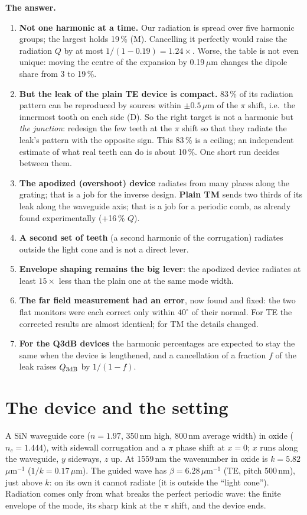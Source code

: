 \documentclass[11pt,a4paper]{article}
\begin{document}
\textbf{The answer.}
\begin{enumerate}\setlength{\itemsep}{2pt}
\item \textbf{Not one harmonic at a time.} Our radiation is spread over five harmonic groups; the largest holds 19\,\%
(M). Cancelling it perfectly would raise the radiation $Q$ by at most $1/(1-0.19)=1.24\times$. Worse, the table is not
even unique: moving the centre of the expansion by 0.19\,$\mu$m changes the dipole share from 3 to 19\,\%.
\item \textbf{But the leak of the plain TE device is compact.} 83\,\% of its radiation pattern can be reproduced by
sources within $\pm0.5$\,$\mu$m of the $\pi$ shift, i.e.\ the innermost tooth on each side (D). So the right target is
not a harmonic but \emph{the junction}: redesign the few teeth at the $\pi$ shift so that they radiate the leak's
pattern with the opposite sign. This 83\,\% is a ceiling; an independent estimate of what real teeth can do is about
10\,\%. One short run decides between them.
\item \textbf{The apodized (overshoot) device} radiates from many places along the grating; that is a job for the
inverse design. \textbf{Plain TM} sends two thirds of its leak along the waveguide axis; that is a job for a periodic
comb, as already found experimentally (+16\,\% $Q$).
\item \textbf{A second set of teeth} (a second harmonic of the corrugation) radiates outside the light cone and is not
a direct lever.
\item \textbf{Envelope shaping remains the big lever}: the apodized device radiates at least $15\times$ less than the
plain one at the same mode width.
\item \textbf{The far field measurement had an error}, now found and fixed: the two flat monitors were each correct only
within $40^\circ$ of their normal. For TE the corrected results are almost identical; for TM the details changed.
\item \textbf{For the Q3dB devices} the harmonic percentages are expected to stay the same when the device is lengthened,
and a cancellation of a fraction $f$ of the leak raises $Q_{3\rm dB}$ by $1/(1-f)$.
\end{enumerate}

\section{The device and the setting}
A SiN waveguide core ($n=1.97$, 350\,nm high, 800\,nm average width) in oxide ($n_c=1.444$), with sidewall corrugation
and a $\pi$ phase shift at $x=0$; $x$ runs along the waveguide, $y$ sideways, $z$ up. At 1559\,nm the wavenumber in
oxide is $k=5.82$\,$\mu$m$^{-1}$ ($1/k=0.17$\,$\mu$m). The guided wave has $\beta=6.28$\,$\mu$m$^{-1}$ (TE, pitch 500\,nm),
just above $k$: on its own it cannot radiate (it is outside the ``light cone''). Radiation comes only from what breaks the
perfect periodic wave: the finite envelope of the mode, its sharp kink at the $\pi$ shift, and the device ends.
\end{document}
